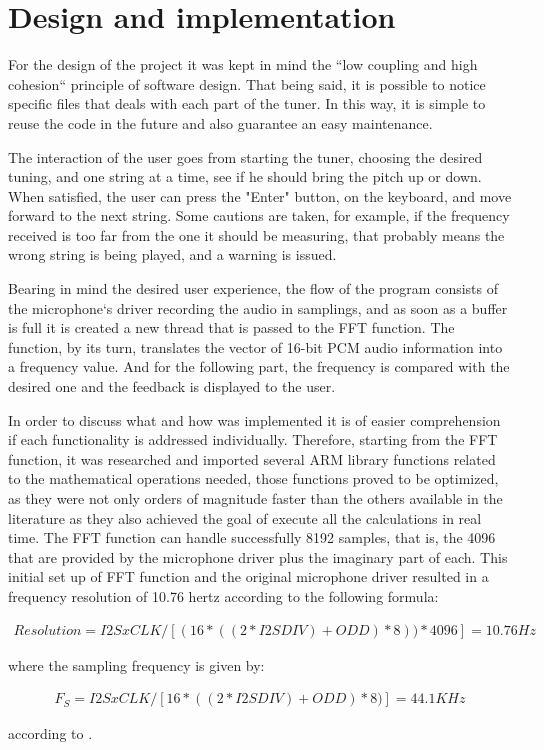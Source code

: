 \section{Design and implementation}

For the design of the project it was kept in mind the ``low coupling and high cohesion`` principle of software design.  That being said, it is possible to notice specific files that deals with each part of the tuner. In this way, it is simple to reuse the code in the future and also guarantee an easy maintenance.

The interaction of the user goes from starting the tuner, choosing the desired tuning, and one string at a time, see if he should bring the pitch up or down. When satisfied, the user can press the "Enter" button, on the keyboard, and move forward to the next string. Some cautions are taken, for example, if the frequency received is too far from the one it should be measuring, that probably means the wrong string is being played, and a warning is issued.

Bearing in mind the desired user experience, the flow of the program consists of the microphone`s driver recording the audio in samplings, and as soon as a buffer is full it is created a new thread that is passed to the FFT function. The function, by its turn, translates the vector of 16-bit PCM audio information into a frequency value. And for the following part, the frequency is compared with the desired one and the feedback is displayed to the user.

In order to discuss what and how was implemented it is of easier comprehension if each functionality is addressed individually. Therefore, starting from the FFT function, it was researched and imported several ARM library functions related to the mathematical operations needed, those functions proved to be optimized, as they were not only orders of magnitude faster than the others available in the literature as they also achieved the goal of execute all the calculations in real time. The FFT function can handle successfully 8192 samples, that is, the 4096 that are provided by the microphone driver plus the imaginary part of each. This initial set up of FFT function and the original microphone driver resulted in a frequency resolution of 10.76 hertz according to the following formula:

\begin{ceqn}
\begin{align}
   Resolution = I2SxCLK /  [(16 * ((2 * I2SDIV) + ODD) * 8)) * 4096] = 10.76 Hz
\end{align}
\end{ceqn}
where the sampling frequency is given by:
\begin{ceqn}
\begin{align}
   F_S = I2SxCLK /  [16 * ((2 * I2SDIV) + ODD) * 8)] = 44.1 KHz
\end{align}
\end{ceqn}
according to \cite{rm0090}.

